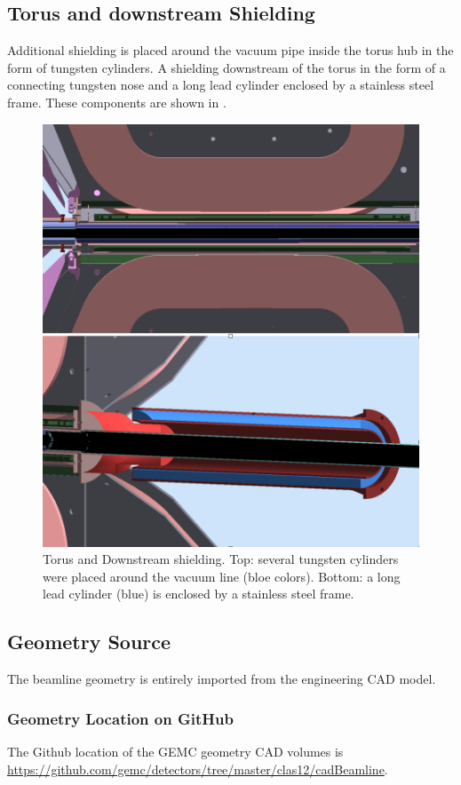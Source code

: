 \subsection{Torus and downstream Shielding}
Additional shielding is placed around the vacuum pipe inside the torus hub in the form of tungsten cylinders.
A shielding downstream of the torus in the form of a connecting tungsten nose and a long lead cylinder enclosed by a stainless steel frame.
These components are shown in .

\begin{figure}
	\centering
	\includegraphics[width=0.98\columnwidth,keepaspectratio]{img/downstreamShielding.png}
	\caption{Torus and Downstream shielding. Top: several tungsten cylinders were placed around the vacuum line (bloe colors).
            Bottom: a long lead cylinder (blue) is enclosed by a stainless steel frame.}
	\label{fig:downstreamShielding}
\end{figure}



\subsection{Geometry Source}

The beamline geometry is entirely imported from the engineering CAD model.

\subsubsection{Geometry Location on GitHub}

The Github location of the GEMC geometry CAD volumes is \url{https://github.com/gemc/detectors/tree/master/clas12/cadBeamline}.
